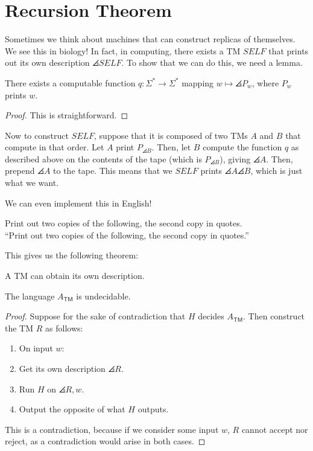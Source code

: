 \documentclass{standalone}
\begin{document}
\section{Recursion Theorem}
Sometimes we think about machines that can construct replicas of themselves.
We see this in biology!
In fact, in computing, there exists a \textsf{TM} \(\mathit{SELF}\)
that prints out its own description \(\angles{\textit{SELF}}\).
To show that we can do this, we need a lemma.

\begin{lemma}
  There exists a computable function \(q \colon \Sigma^* \to \Sigma^*\)
  mapping \(w \mapsto \angles{P_w}\), where \(P_w\) prints \(w\).
\end{lemma}
\begin{proof}
  This is straightforward.
\end{proof}

Now to construct \(\mathit{SELF}\),
suppose that it is composed of two \textsf{TM}s \(A\) and \(B\)
that compute in that order.
Let \(A\) print \(P_{\angles B}\).
Then, let \(B\) compute the function \(q\) as described above
on the contents of the tape (which is \(P_{\angles B}\)), giving \(\angles A\).
Then, prepend \(\angles A\) to the tape.
This means that we \(\mathit{SELF}\) prints \(\angles A \angles B\),
which is just what we want.

We can even implement this in English!
\begin{algorithm*}
  Print out two copies of the following, the second copy in quotes. \\
  ``Print out two copies of the following, the second copy in quotes.''
\end{algorithm*}

This gives us the following theorem:
\begin{theorem}
  A \textsf{TM} can obtain its own description.
\end{theorem}

\begin{corollary}
  The language \(A_{\textsf{TM}}\) is undecidable.
\end{corollary}
\begin{proof}
  Suppose for the sake of contradiction that \(H\) decides \(A_{\textsf{TM}}\).
  Then construct the \textsf{TM} \(R\) as follows:
  \begin{enumerate}[start=0]
    \item On input \(w\):
    \item Get its own description \(\angles{R}\).
    \item Run \(H\) on \(\angles{R, w}\).
    \item Output the opposite of what \(H\) outputs.
  \end{enumerate}
  
  This is a contradiction, because if we consider some input \(w\),
  \(R\) cannot accept nor reject, as a contradiction would arise in both cases.
\end{proof}
\end{document}
